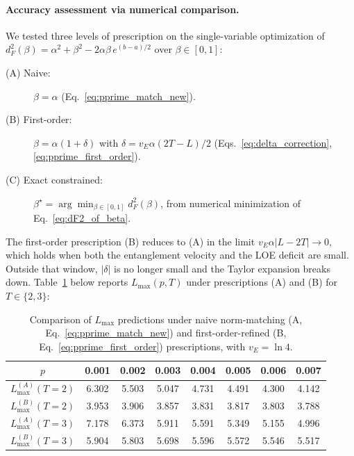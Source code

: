 \documentclass[%
 reprint,
superscriptaddress,
 amsmath,amssymb,
 aps,
]{revtex4-2}
\begin{document}
\paragraph*{Accuracy assessment via numerical comparison.}
We tested three levels of prescription on the single-variable optimization of $d_F^2(\beta) = \alpha^2+\beta^2 - 2\alpha\beta\,e^{(b-a)/2}$ over $\beta\in[0,1]$:
\begin{description}
    \item[\textnormal{(A) Naive:}] $\beta=\alpha$ (Eq.~\eqref{eq:pprime_match_new}).
    \item[\textnormal{(B) First-order:}] $\beta=\alpha(1+\delta)$ with $\delta = v_E\alpha(2T-L)/2$ (Eqs.~\eqref{eq:delta_correction}, \eqref{eq:pprime_first_order}).
    \item[\textnormal{(C) Exact constrained:}] $\beta^\star = \arg\min_{\beta\in[0,1]} d_F^2(\beta)$, from numerical minimization of Eq.~\eqref{eq:dF2_of_beta}.
\end{description}

The first-order prescription (B) reduces to (A) in the limit $v_E\alpha|L-2T|\to 0$, which holds when both the entanglement velocity and the LOE deficit are small. Outside that window, $|\delta|$ is no longer small and the Taylor expansion breaks down. Table~\ref{tab:L_max_comparison} below reports $L_{\max}(p,T)$ under prescriptions (A) and (B) for $T\in\{2,3\}$:

\begin{table}[]
    \centering
    \begin{tabular}{|c|c|c|c|c|c|c|c|}
    \hline
       $p$ & 0.001 & 0.002 & 0.003 & 0.004 & 0.005 & 0.006 & 0.007 \\
       \hline
       $L_{\max}^{(A)}(T=2)$ & 6.302 & 5.503 & 5.047 & 4.731 & 4.491 & 4.300 & 4.142 \\
       $L_{\max}^{(B)}(T=2)$ & 3.953 & 3.906 & 3.857 & 3.831 & 3.817 & 3.803 & 3.788 \\
       \hline
       $L_{\max}^{(A)}(T=3)$ & 7.178 & 6.373 & 5.911 & 5.591 & 5.349 & 5.155 & 4.996 \\
       $L_{\max}^{(B)}(T=3)$ & 5.904 & 5.803 & 5.698 & 5.596 & 5.572 & 5.546 & 5.517 \\
       \hline
    \end{tabular}
    \caption{Comparison of $L_{\max}$ predictions under naive norm-matching (A, Eq.~\eqref{eq:pprime_match_new}) and first-order-refined (B, Eq.~\eqref{eq:pprime_first_order}) prescriptions, with $v_E=\ln 4$.}
    \label{tab:L_max_comparison}
\end{table}
\end{document}
